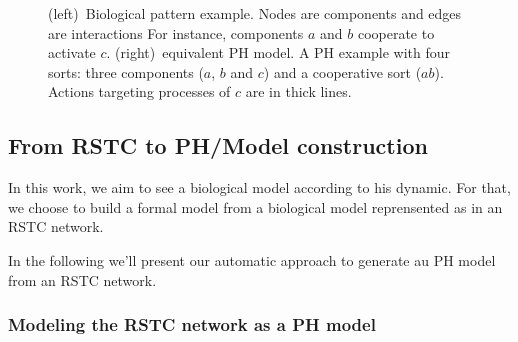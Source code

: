\begin{example}
\begin{figure}[!t]
\begin{minipage}{0.7\linewidth}
{
}
\end{minipage}

\caption{\label{fig:modelingBRN}
(left)~Biological pattern example.
Nodes are components and edges are interactions
For instance, components $a$ and $b$ cooperate to activate $c$.
(right)~equivalent PH model. \label{fig:runningPH}
A PH example with four sorts: three components ($a$, $b$ and $c$) and a cooperative sort ($ab$).
Actions targeting processes of $c$ are in thick lines.
}
\end{figure}

\end{example}




\subsection{From RSTC to PH/Model construction}
In this work, we aim to see a biological  model according to his dynamic. For that, we choose to build a formal model from a biological model reprensented as in an RSTC network.

In the following we'll present our automatic approach to generate au PH model from an RSTC network.


\subsubsection{Modeling the RSTC network as a PH model}


